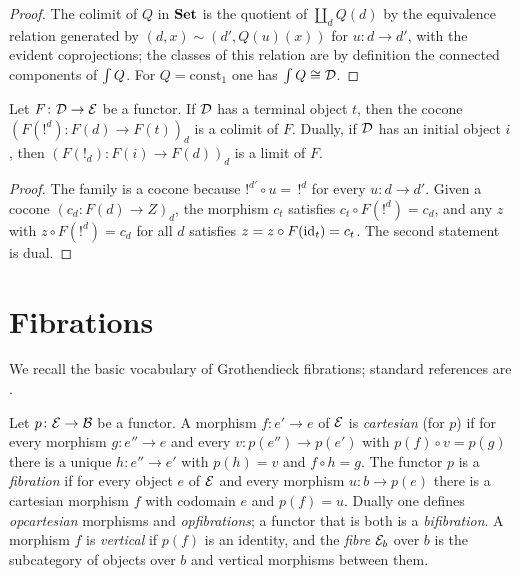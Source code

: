 \begin{proof}
The colimit of $Q$ in $\mathbf{Set}$ is the quotient of $\coprod_dQ(d)$ by the
equivalence relation generated by $(d,x)\sim(d',Q(u)(x))$ for
$u\colon d\to d'$, with the evident coprojections; the classes of this
relation are by definition the connected components of $\textstyle\int Q$. For
$Q=\mathrm{const}_1$ one has $\textstyle\int Q\cong\mathcal{D}$.
\end{proof}

\begin{lemma}\label{lem:colim-terminal}
Let $F\colon\mathcal{D}\to\mathcal{E}$ be a functor. If $\mathcal{D}$ has a terminal object $t$, then
the cocone $(F(!^d)\colon F(d)\to F(t))_d$ is a colimit of $F$. Dually, if
$\mathcal{D}$ has an initial object $i$, then $(F(!_d)\colon F(i)\to F(d))_d$ is a
limit of $F$.
\end{lemma}

\begin{proof}
The family is a cocone because $!^{d'}\circ u=\,!^d$ for every
$u\colon d\to d'$. Given a cocone $(c_d\colon F(d)\to Z)_d$, the morphism
$c_t$ satisfies $c_t\circ F(!^d)=c_d$, and any $z$ with $z\circ F(!^d)=c_d$
for all $d$ satisfies $z=z\circ F(\mathrm{id}_t)=c_t$. The second statement is dual.
\end{proof}

\section{Fibrations}\label{sec:fib-prelim}

We recall the basic vocabulary of Grothendieck fibrations; standard references
are \cite{SGA1,Jacobs1999,Borceux1994}.

\begin{definition}\label{def:cartesian}
Let $p\colon\mathcal{E}\to\mathcal{B}$ be a functor. A morphism $f\colon e'\to e$ of $\mathcal{E}$ is
\emph{cartesian} (for $p$) if for every morphism $g\colon e''\to e$ and every
$v\colon p(e'')\to p(e')$ with $p(f)\circ v=p(g)$ there is a unique
$h\colon e''\to e'$ with $p(h)=v$ and $f\circ h=g$. The functor $p$ is a
\emph{fibration} if for every object $e$ of $\mathcal{E}$ and every morphism
$u\colon b\to p(e)$ there is a cartesian morphism $f$ with codomain $e$ and
$p(f)=u$. Dually one defines \emph{opcartesian} morphisms and
\emph{opfibrations}; a functor that is both is a \emph{bifibration}. A
morphism $f$ is \emph{vertical} if $p(f)$ is an identity, and the \emph{fibre}
$\mathcal{E}_b$ over $b$ is the subcategory of objects over $b$ and vertical
morphisms between them.
\end{definition}

